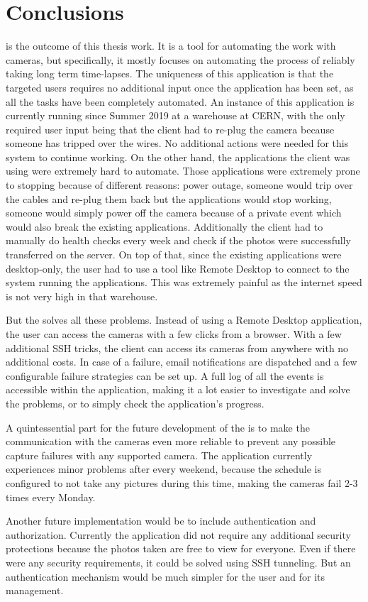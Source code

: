 \section*{Conclusions}

\ThesisTitle is the outcome of this thesis work. It is a tool for automating the work with cameras, but specifically, it mostly focuses on automating the process of reliably taking long term time-lapses. The uniqueness of this application is that the targeted users requires no additional input once the application has been set, as all the tasks have been completely automated. An instance of this application is currently running since Summer 2019 at a warehouse at CERN, with the only required user input being that the client had to re-plug the camera because someone has tripped over the wires. No additional actions were needed for this system to continue working. On the other hand, the applications the client was using were extremely hard to automate. Those applications were extremely prone to stopping because of different reasons: power outage, someone would trip over the cables and re-plug them back but the applications would stop working, someone would simply power off the camera because of a private event which would also break the existing applications. Additionally the client had to manually do health checks every week and check if the photos were successfully transferred on the server. On top of that, since the existing applications were desktop-only, the user had to use a tool like Remote Desktop to connect to the system running the applications. This was extremely painful as the internet speed is not very high in that warehouse.

\vspace{0.3cm}
But the \ThesisTitle solves all these problems. Instead of using a Remote Desktop application, the user can access the cameras with a few clicks from a browser. With a few additional SSH tricks, the client can access its cameras from anywhere with no additional costs. In case of a failure, email notifications are dispatched and a few configurable failure strategies can be set up. A full log of all the events is accessible within the application, making it a lot easier to investigate and solve the problems, or to simply check the application's progress.

\vspace{0.3cm}
A quintessential part for the future development of the \ThesisTitle is to make the communication with the cameras even more reliable to prevent any possible capture failures with any supported camera. The application currently experiences minor problems after every weekend, because the schedule is configured to not take any pictures during this time, making the cameras fail 2-3 times every Monday.

\vspace{0.3cm}
Another future implementation would be to include authentication and authorization. Currently the application did not require any additional security protections because the photos taken are free to view for everyone. Even if there were any security requirements, it could be solved using SSH tunneling. But an authentication mechanism would be much simpler for the user and for its management.

\clearpage